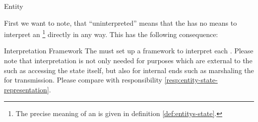 \documentclass[a4paper, 12pt]{book}
\begin{document}
\begin{definition*}{Entity}
  \label{def:entity} 
\end{definition*}
%
First we want to note, that ``uninterpreted'' means that the \SYNEIGHT
has no means to interpret an \footnote{The precise
  meaning of an  is given in definition
  \vref{def:entitys-state}.} directly in any way. This has the following
consequence:
\begin{remark*}{Interpretation Framework}
  The \SYNEIGHT must set up a framework to interpret
  each . Please note that
  interpretation is not only needed for purposes which are external to the
  \SYNEIGHT such as accessing the state itself, but also for internal
  ends such as marshaling the  for transmission. Please
  compare with responsibility \vref{resp:entity-state-representation}.
\end{remark*}

\end{document}
